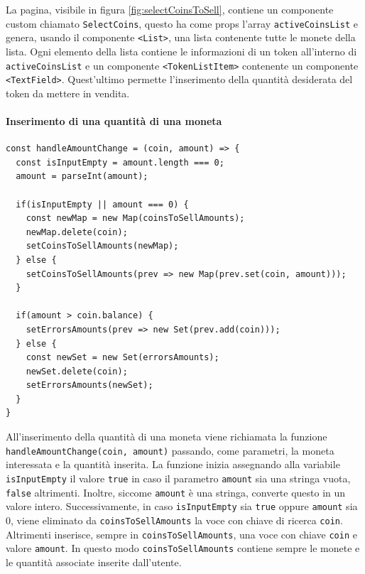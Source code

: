 \documentclass[a4paper]{article}
\begin{document}
        La pagina, visibile in figura \ref{fig:selectCoinsToSell}, contiene un componente custom chiamato \verb|SelectCoins|, questo ha come props l'array \verb|activeCoinsList| e genera, usando il componente \verb|<List>|, una lista contenente tutte le monete della lista.
        \newline
        Ogni elemento della lista contiene le informazioni di un token all'interno di \verb|activeCoinsList| e un componente
        \verb|<TokenListItem>| contenente un componente \verb|<TextField>|. Quest'ultimo permette l'inserimento della quantità desiderata del token da mettere in vendita.
        \paragraph{Inserimento di una quantità di una moneta}
        \label{insertCoinsToSell}
        \begin{lstlisting}[style=ES6, title={Funzione handleAmountChange}]
const handleAmountChange = (coin, amount) => {
  const isInputEmpty = amount.length === 0;
  amount = parseInt(amount);

  if(isInputEmpty || amount === 0) {
    const newMap = new Map(coinsToSellAmounts);
    newMap.delete(coin);
    setCoinsToSellAmounts(newMap);
  } else {
    setCoinsToSellAmounts(prev => new Map(prev.set(coin, amount)));
  }

  if(amount > coin.balance) {
    setErrorsAmounts(prev => new Set(prev.add(coin)));
  } else {
    const newSet = new Set(errorsAmounts);
    newSet.delete(coin);
    setErrorsAmounts(newSet);
  }
}\end{lstlisting}
        All'inserimento della quantità di una moneta viene richiamata la funzione \verb|handleAmountChange(coin, amount)| passando, come parametri, la moneta interessata e la quantità inserita.
        \newline
        La funzione inizia assegnando alla variabile \verb|isInputEmpty| il valore \verb|true| in caso il parametro \verb|amount| sia una stringa vuota, \verb|false| altrimenti. Inoltre, siccome \verb|amount| è una stringa, converte questo in un valore intero.
        \newline
        Successivamente, in caso \verb|isInputEmpty| sia \verb|true| oppure \verb|amount| sia 0, viene eliminato da \verb|coinsToSellAmounts| la voce con chiave di ricerca \verb|coin|. Altrimenti inserisce, sempre in \verb|coinsToSellAmounts|, una voce con chiave \verb|coin| e valore \verb|amount|.
        In questo modo \verb|coinsToSellAmounts| contiene sempre le monete e le quantità associate inserite dall'utente.
\end{document}
